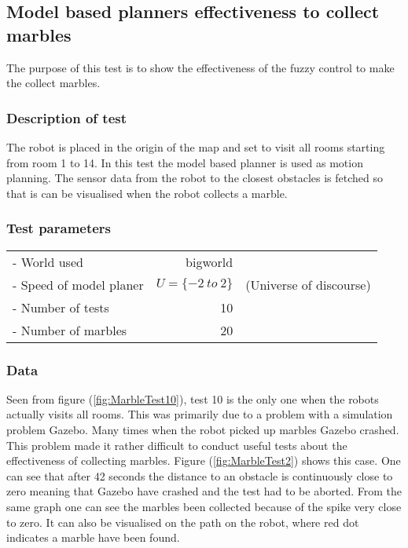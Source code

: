\documentclass[../Head/Main.tex]{subfiles}
\begin{document}
\subsection{Model based planners effectiveness to collect marbles}
\label{subsec:testCollectMarbles}

The purpose of this test is to show the effectiveness of the fuzzy control to make the collect marbles. 

\subsubsection*{Description of test}  

The robot is placed in the origin of the map and set to visit all rooms starting from room 1 to 14. In this test the model based planner is used as motion planning. The sensor data from the robot to the closest obstacles is fetched so that is can be visualised when the robot collects a marble.         

\subsubsection*{Test parameters}

\begin{tabular}{l r l}
	- World used                & bigworld &\\	
	- Speed of model planer     & $U=\{-2~to~2\}$ & (Universe of discourse)\\
	- Number of tests           & 10 & \\
	- Number of marbles         & 20 &
\end{tabular}

\subsubsection*{Data}
Seen from figure (\ref{fig:MarbleTest10}), test 10 is the only one when the robots actually visits all rooms. This was primarily due to a problem with a simulation problem Gazebo. Many times when the robot picked up marbles Gazebo crashed. This problem made it rather difficult to conduct useful tests about the effectiveness of collecting marbles. Figure (\ref{fig:MarbleTest2}) shows this case. One can see that after 42 seconds the distance to an obstacle is continuously close to zero meaning that Gazebo have crashed and the test had to be aborted. From the same graph one can see the marbles been collected because of the spike very close to zero. It can also be visualised on the path on the robot, where red dot indicates a marble have been found.              
\end{document}
